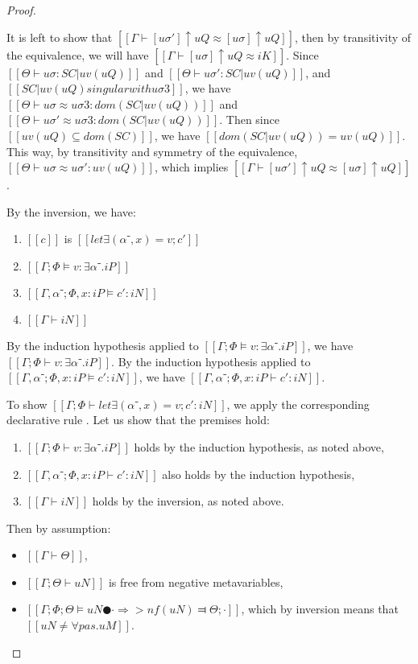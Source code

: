 \begin{proof}
\begin{caseof}
\begin{itemize}
            It is left to show that $[[Γ ⊢ [uσ']↑uQ ≈ [uσ]↑uQ]]$, 
            then by transitivity of the equivalence, we will have $[[Γ ⊢ [uσ]↑uQ ≈ iK]]$.
            Since $[[Θ ⊢ uσ : SC|uv(uQ)]]$ and $[[Θ ⊢ uσ' : SC|uv(uQ)]]$, 
            and $[[SC|uv(uQ) singular with uσ3]]$, we have 
            $[[Θ ⊢ uσ ≈ uσ3 : dom(SC|uv(uQ))]]$
            and $[[Θ ⊢ uσ' ≈ uσ3 : dom(SC|uv(uQ))]]$.
            Then since $[[uv(uQ) ⊆ dom(SC)]]$, we have $[[dom(SC|uv(uQ)) = uv(uQ)]]$.
            This way, by transitivity and symmetry of the equivalence, 
            $[[Θ ⊢ uσ ≈ uσ' : uv(uQ)]]$, which implies
            $[[Γ ⊢ [uσ']↑uQ ≈ [uσ]↑uQ]]$. 
        \end{itemize}

        \item {}
        By the inversion, we have:
        \begin{enumerate}
            \item $[[c]]$ is $[[let∃ (α⁻, x) = v; c']]$
            \item $[[Γ; Φ ⊨ v : ∃α⁻.iP]]$
            \item $[[Γ, α⁻ ; Φ, x:iP ⊨ c' : iN]]$
            \item $[[Γ ⊢ iN]]$
        \end{enumerate}

        By the induction hypothesis applied to 
        $[[Γ; Φ ⊨ v : ∃α⁻.iP]]$, we have $[[Γ; Φ ⊢ v : ∃α⁻.iP]]$.
        By the induction hypothesis applied to
        $[[Γ, α⁻ ; Φ, x:iP ⊨ c' : iN]]$, we have $[[Γ, α⁻ ; Φ, x:iP ⊢ c' : iN]]$.

        To show $[[Γ; Φ ⊢ let∃ (α⁻, x) = v; c' : iN]]$, we apply the corresponding
        declarative rule . Let us show that the premises hold:
        \begin{enumerate}
            \item $[[Γ ; Φ ⊢ v : ∃α⁻.iP]]$ holds by the induction hypothesis, as noted above,
            \item $[[Γ, α⁻ ; Φ, x:iP ⊢ c' : iN]]$ also holds by the induction hypothesis,
            \item $[[Γ ⊢ iN]]$ holds by the inversion, as noted above.
        \end{enumerate}

        \item {}
        Then by assumption:
        \begin{itemize}
            \item $[[Γ ⊢ Θ]]$,
            \item $[[Γ; Θ ⊢ uN]]$ is free from negative metavariables,
            \item $[[Γ; Φ; Θ ⊨ uN ● · ⇒> nf(uN) ⫤ Θ; ·]]$, which by inversion means that $[[uN ≠ ∀pas.uM]]$.
        \end{itemize}


\end{caseof}
\end{proof}
